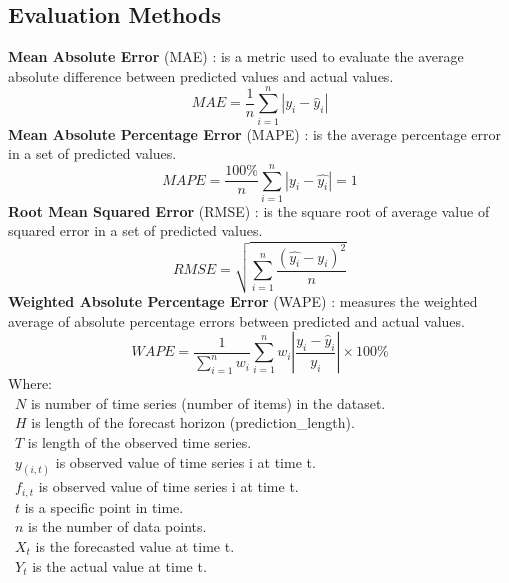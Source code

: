 \documentclass{ieeeojies}
\begin{document}
\subsection{Evaluation Methods}
\textbf{Mean Absolute Error} (MAE) \cite{b11}: is a metric used to evaluate the average absolute difference between predicted values and actual values.\\
    \[MAE = \frac{1}{n} \sum_{i=1}^{n} |y_i - \hat{y}_i|\]
\textbf{Mean Absolute Percentage Error} (MAPE) \cite{b11}: is the average percentage error in a set of predicted values.\\
    \[MAPE=\frac{100\%}{n}  \sum_{i=1}^{n} |y_i-\hat{y_i} |  = 1 \]
\textbf{Root Mean Squared Error} (RMSE) \cite{b11}: is the square root of average value of squared error in a set of predicted values.\\
    \[RMSE=\sqrt{\sum_{i=1}^{n} \frac{(\hat{y_i}-y_i )^2}{n} }\]
\textbf{Weighted Absolute Percentage Error} (WAPE) \cite{b11}: measures the weighted average of absolute percentage errors between predicted and actual values.\\
    \[WAPE = \frac{1}{\sum_{i=1}^{n} w_i} \sum_{i=1}^{n} w_i \left| \frac{y_i - \hat{y}_i}{y_i} \right| \times 100\%\]
Where: \\
    \indent\ \(N\) is number of time series (number of items) in the dataset.\\
    \indent\ \(H\) is length of the forecast horizon (prediction\_length).\\
    \indent\ \(T\) is length of the observed time series.\\
    \indent\ \(y_(i,t)\) is observed value of time series i at time t.\\
    \indent\ \(f_{i,t}\) is observed value of time series i at time t.\\
    \indent\ \(t\) is a specific point in time.\\
    \indent\ \(n\) is the number of data points.\\
    \indent\ \(X_t\) is the forecasted value at time t.\\
    \indent\ \(Y_t\) is the actual value at time t.\\
\end{document}
